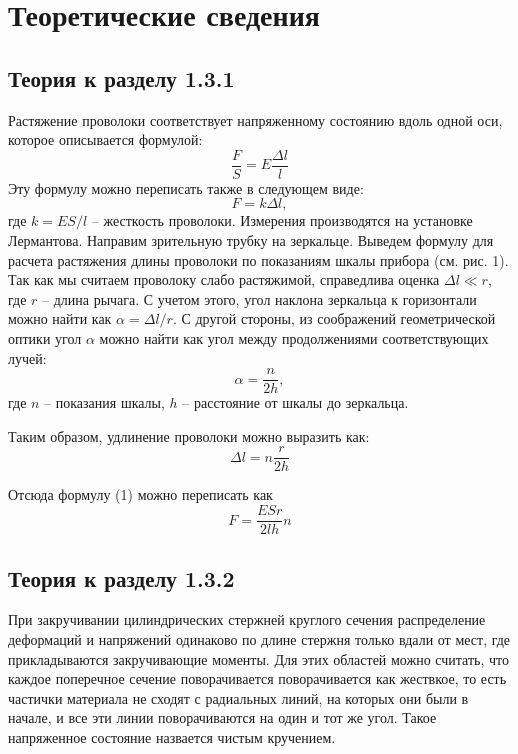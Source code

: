 \documentclass[a4paper,12pt]{article}
\begin{document}
\section{Теоретические сведения}

\subsection{Теория к разделу 1.3.1}
\label{thery-1-3-1}
Растяжение проволоки соответствует напряженному состоянию вдоль одной оси, которое описывается формулой:
\begin{equation}
    \frac{F}{S} = E \frac{\Delta l}{l}
    \label{lermantov}
\end{equation}
    Эту формулу можно переписать также в следующем виде:
    \begin{equation}
        F = k\Delta l,
    \end{equation}
    где $k = ES / l$ -- жесткость проволоки.
    Измерения производятся на установке Лермантова.
    Направим зрительную трубку на зеркальце.
    Выведем формулу для расчета растяжения длины проволоки по показаниям шкалы
    прибора (см. рис. 1).
    Так как мы считаем проволоку слабо растяжимой, справедлива оценка $\Delta l \ll r$, где
    $r$ -- длина рычага. С учетом этого, угол наклона зеркальца к горизонтали можно
    найти как $\alpha = \Delta l/r$. С другой стороны, из соображений геометрической оптики
    угол $\alpha$ можно найти как угол между продолжениями соответствующих лучей:
    \begin{equation}
        \alpha = \frac{n}{2h},
    \end{equation}
    где $n$ -- показания шкалы, $h$ -- расстояние от шкалы до
    зеркальца.
    \par Таким образом, удлинение проволоки можно выразить как:
    \begin{equation}
        \Delta l = n\frac{r}{2h}
        \label{dlina}
    \end{equation}

    Отсюда формулу (1) можно переписать как
    \begin{equation}
        F = \frac{ESr}{2lh}n
    \end{equation}

\subsection{Теория к разделу 1.3.2}

При закручивании цилиндрических стержней круглого сечения распределение деформаций
 и напряжений одинаково по длине стержня только вдали от мест, где прикладываются закручивающие моменты.
Для этих областей можно считать, что каждое поперечное сечение поворачивается поворачивается как жествкое,
то есть частички материала не сходят с радиальных линий, на которых они были в начале, и все
эти линии поворачиваются на один и тот же угол. Такое напряженное состояние назвается чистым кручением.\\
\end{document}

